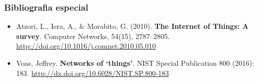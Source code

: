 \documentclass{beamer}
\begin{document}
\begin{frame}
\frametitle{Bibliografia especial}
\begin{itemize}	
	\item Atzori, L., Iera, A., \& Morabito, G. (2010). \textbf{The Internet of Things: A survey}. Computer Networks, 54(15), 2787–2805. \url{http://doi.org/10.1016/j.comnet.2010.05.010}
	
	\item Voas, Jeffrey. \textbf{Networks of ‘things’}. NIST Special Publication 800 (2016): 183. \url{http://dx.doi.org/10.6028/NIST.SP.800-183}
\end{itemize}
\end{frame}

\frame{\titlepage}
\end{document}
